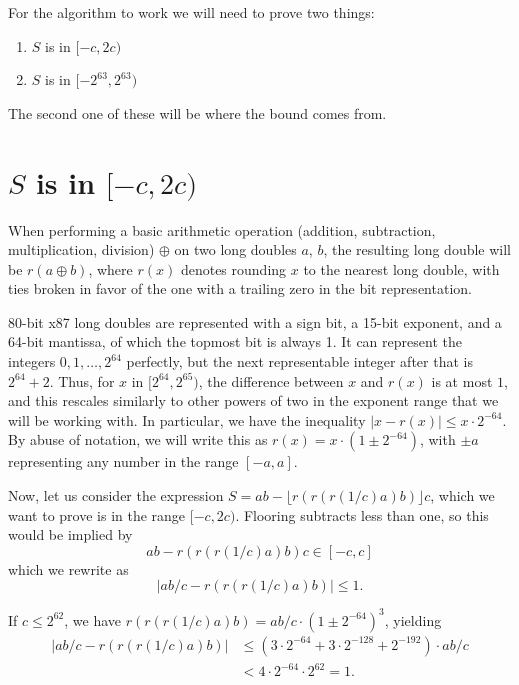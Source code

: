 \documentclass{article}
\begin{document}
For the algorithm to work we will need to prove two things:
\begin{enumerate}
    \item $S$ is in $[-c, 2c)$
    \item $S$ is in $[-2^{63}, 2^{63})$
\end{enumerate}

The second one of these will be where the bound comes from.

\section{$S$ is in $[-c, 2c)$}

When performing a basic arithmetic operation (addition, subtraction, multiplication, division) $\oplus$ on two long doubles $a$, $b$, the resulting long double will be $r(a \oplus b)$, where $r(x)$ denotes rounding $x$ to the nearest long double, with ties broken in favor of the one with a trailing zero in the bit representation.

80-bit x87 long doubles are represented with a sign bit, a 15-bit exponent, and a 64-bit mantissa, of which the topmost bit is always 1.
It can represent the integers $0, 1, \dots, 2^{64}$ perfectly, but the next representable integer after that is $2^{64} + 2$.
Thus, for $x$ in $[2^{64}, 2^{65})$, the difference between $x$ and $r(x)$ is at most $1$, and this rescales similarly to other powers of two in the exponent range that we will be working with. In particular, we have the inequality $|x - r(x)| \le x \cdot 2^{-64}$. By abuse of notation, we will write this as $r(x) = x \cdot (1 \pm 2^{-64})$, with $\pm a$ representing any number in the range $[-a, a]$.

Now, let us consider the expression $S = ab - \lfloor r(r(r(1/c)a)b) \rfloor c$, which we want to prove is in the range $[-c, 2c)$. Flooring subtracts less than one, so this would be implied by
\[ ab - r(r(r(1/c)a)b) c \in [-c, c] \]
which we rewrite as
\[ |ab/c - r(r(r(1/c)a)b)| \le 1. \]

If $c \le 2^{62}$, we have $r(r(r(1/c)a)b) = ab/c\cdot(1 \pm 2^{-64})^3$, yielding
\begin{align*}
|ab/c - r(r(r(1/c)a)b)| &\le (3\cdot 2^{-64} + 3 \cdot 2^{-128} + 2^{-192}) \cdot ab/c \\
                      &< 4\cdot 2^{-64} \cdot 2^{62} = 1.
\end{align*}
\end{document}
